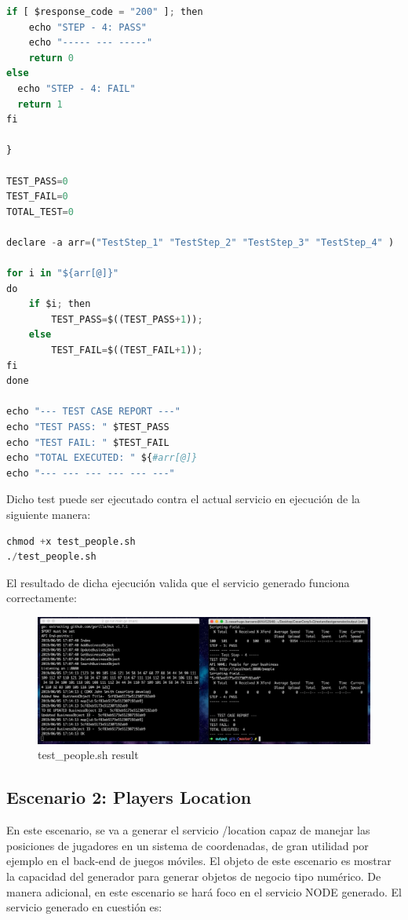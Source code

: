 \documentclass[a4paper,11pt]{book}
\begin{document}
\begin{lstlisting}[language=python,caption={  test\_people.sh }]
if [ $response_code = "200" ]; then
    echo "STEP - 4: PASS"
    echo "----- --- -----"
    return 0
else
  echo "STEP - 4: FAIL"
  return 1
fi

}

TEST_PASS=0
TEST_FAIL=0
TOTAL_TEST=0

declare -a arr=("TestStep_1" "TestStep_2" "TestStep_3" "TestStep_4" )

for i in "${arr[@]}"
do
    if $i; then
        TEST_PASS=$((TEST_PASS+1));
    else
        TEST_FAIL=$((TEST_FAIL+1));
fi
done

echo "--- TEST CASE REPORT ---"
echo "TEST PASS: " $TEST_PASS
echo "TEST FAIL: " $TEST_FAIL
echo "TOTAL EXECUTED: " ${#arr[@]}
echo "--- --- --- --- --- ---"
\end{lstlisting} 

Dicho test puede ser ejecutado contra el actual servicio en ejecución de la siguiente manera:


\begin{lstlisting}[language=python,caption={  exec test\_people.sh }]
chmod +x test_people.sh
./test_people.sh
\end{lstlisting} 

El resultado de dicha ejecución valida que el servicio generado funciona correctamente:


\begin{figure}[H]  
\centering 
\includegraphics[scale=0.25]{imagenes/t14.png}
\caption{ test\_people.sh result}  
\end{figure}

\subsection{Escenario 2: Players Location}

En este escenario, se va a generar el servicio /location capaz de manejar las posiciones de jugadores en un sistema de coordenadas, de gran utilidad por ejemplo en el back-end de juegos móviles. El objeto de este escenario es mostrar la capacidad del generador para generar objetos de negocio tipo numérico. De manera adicional, en este escenario se hará foco en el servicio NODE generado. El servicio generado en cuestión es:
\end{document}
